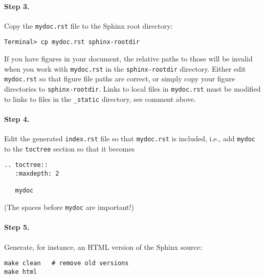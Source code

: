 \documentclass[%
oneside,                 %
final,                   %
10pt]{article}
\begin{document}
\paragraph{Step 3.}
Copy the {\fontsize{10pt}{10pt}\Verb!mydoc.rst!} file to the Sphinx root directory:
\vspace{4pt}
\begin{Verbatim}[numbers=none,frame=lines,label=\fbox{{\tiny Terminal}},fontsize=\fontsize{9pt}{9pt},
labelposition=topline,framesep=2.5mm,framerule=0.7pt]
Terminal> cp mydoc.rst sphinx-rootdir
\end{Verbatim}
If you have figures in your document, the relative paths to those will
be invalid when you work with {\fontsize{10pt}{10pt}\Verb!mydoc.rst!} in the {\fontsize{10pt}{10pt}\Verb!sphinx-rootdir!}
directory. Either edit {\fontsize{10pt}{10pt}\Verb!mydoc.rst!} so that figure file paths are correct,
or simply copy your figure directories to {\fontsize{10pt}{10pt}\Verb!sphinx-rootdir!}.
Links to local files in {\fontsize{10pt}{10pt}\Verb!mydoc.rst!} must be modified to links to
files in the {\fontsize{10pt}{10pt}\Verb!_static!} directory, see comment above.

\paragraph{Step 4.}
Edit the generated {\fontsize{10pt}{10pt}\Verb!index.rst!} file so that {\fontsize{10pt}{10pt}\Verb!mydoc.rst!}
is included, i.e., add {\fontsize{10pt}{10pt}\Verb!mydoc!} to the {\fontsize{10pt}{10pt}\Verb!toctree!} section so that it becomes
\begin{Verbatim}[fontsize=\fontsize{9pt}{9pt},tabsize=8,baselinestretch=0.85,
fontfamily=tt,xleftmargin=7mm]
.. toctree::
   :maxdepth: 2

   mydoc
\end{Verbatim}
\noindent
(The spaces before {\fontsize{10pt}{10pt}\Verb!mydoc!} are important!)

\paragraph{Step 5.}
Generate, for instance, an HTML version of the Sphinx source:
\vspace{4pt}
\begin{Verbatim}[numbers=none,frame=lines,label=\fbox{{\tiny Terminal}},fontsize=\fontsize{9pt}{9pt},
labelposition=topline,framesep=2.5mm,framerule=0.7pt]
make clean   # remove old versions
make html
\end{Verbatim}
\end{document}
